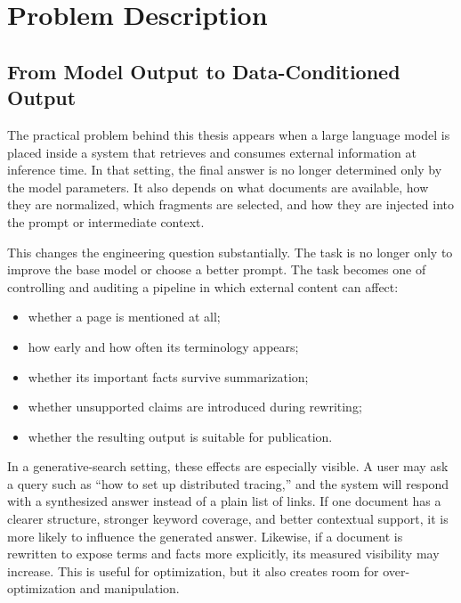 
\chapter{Problem Description}\label{chapter:problem}

\section{From Model Output to Data-Conditioned Output}

The practical problem behind this thesis appears when a large language model is placed inside a
system that retrieves and consumes external information at inference time. In that setting, the
final answer is no longer determined only by the model parameters. It also depends on what
documents are available, how they are normalized, which fragments are selected, and how they
are injected into the prompt or intermediate context.

This changes the engineering question substantially. The task is no longer only to improve the
base model or choose a better prompt. The task becomes one of controlling and auditing a
pipeline in which external content can affect:
\begin{itemize}
    \item whether a page is mentioned at all;
    \item how early and how often its terminology appears;
    \item whether its important facts survive summarization;
    \item whether unsupported claims are introduced during rewriting;
    \item whether the resulting output is suitable for publication.
\end{itemize}

In a generative-search setting, these effects are especially visible. A user may ask a query such
as ``how to set up distributed tracing,'' and the system will respond with a synthesized answer
instead of a plain list of links. If one document has a clearer structure, stronger keyword
coverage, and better contextual support, it is more likely to influence the generated answer.
Likewise, if a document is rewritten to expose terms and facts more explicitly, its measured
visibility may increase. This is useful for optimization, but it also creates room for
over-optimization and manipulation.

